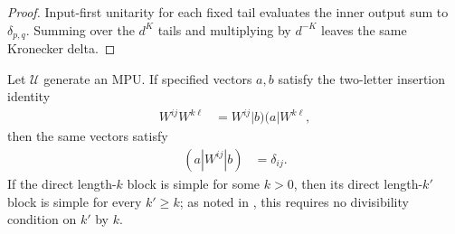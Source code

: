 \begin{proof}\leanok
    Input-first unitarity for each fixed tail evaluates the inner output sum to
    $\delta_{p,q}$.  Summing over the $d^K$ tails and multiplying by $d^{-K}$
    leaves the same Kronecker delta.
\end{proof}


\begin{lemma}
    \label{thm:mpu_all_later_simple_blockings}
    \leanok
    Let $\mathcal U$ generate an MPU.  If specified vectors $a,b$ satisfy the
    two-letter insertion identity
    \begin{align}
        W^{ij}W^{k\ell} & =W^{ij}|b)(a|W^{k\ell},
    \end{align}
    then the same vectors satisfy
    \begin{align}
        (a|W^{ij}|b) & =\delta_{ij}.
    \end{align}
    If the direct length-$k$ block is simple for some $k>0$, then its direct
    length-$k'$ block is simple for every $k'\geq k$; as noted in \cite[Proposition~III.3]{Cirac2017MPU}, this requires no divisibility
    condition on $k'$ by $k$.
\end{lemma}

